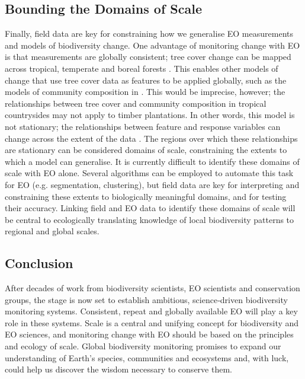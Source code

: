 \subsection{Bounding the Domains of Scale}

Finally, field data are key for constraining how we generalise EO measurements and models of biodiversity change. One advantage of monitoring change with EO is that measurements are globally consistent; tree cover change can be mapped across tropical, temperate and boreal forests \cite{Hansen2013-oz, Sexton2013-rk}. This enables other models of change that use tree cover data as features to be applied globally, such as the models of community composition in \cite{Mendenhall2016-xz}. This would be imprecise, however; the relationships between tree cover and community composition in tropical countrysides may not apply to timber plantations. In other words, this model is not stationary; the relationships between feature and response variables can change across the extent of the data \cite{Hawkins2012-gu}. The regions over which these relationships are stationary can be considered domains of scale, constraining the extents to which a model can generalise. It is currently difficult to identify these domains of scale with EO alone. Several algorithms can be employed to automate this task for EO (e.g. segmentation, clustering), but field data are key for interpreting and constraining these extents to biologically meaningful domains, and for testing their accuracy. Linking field and EO data to identify these domains of scale will be central to ecologically translating knowledge of local biodiversity patterns to regional and global scales.

\subsection{Conclusion}

After decades of work from biodiversity scientists, EO scientists and conservation groups, the stage is now set to establish ambitious, science‐driven biodiversity monitoring systems. Consistent, repeat and globally available EO will play a key role in these systems. Scale is a central and unifying concept for biodiversity and EO sciences, and monitoring change with EO should be based on the principles and ecology of scale. Global biodiversity monitoring promises to expand our understanding of Earth's species, communities and ecosystems and, with luck, could help us discover the wisdom necessary to conserve them.

\clearpage